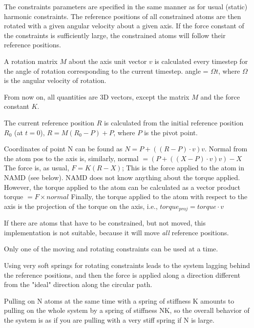 The constraints parameters are specified in the same manner as for
usual (static) harmonic constraints. The reference positions of all
constrained atoms are then rotated with a given angular velocity
about a given axis. If the force constant of the constraints is
sufficiently
large, the constrained atoms will follow their reference positions.

A rotation matrix $M$ about the axis unit vector $v$ is calculated every
timestep
for the angle of rotation corresponding to the current timestep.
    angle = $\Omega t$,
where $\Omega$ is the angular velocity of rotation.

From now on, all quantities are 3D vectors, except the matrix $M$ and the
force constant $K$.

The current reference position $R$ is calculated from the initial
reference
position $R_0$ (at $t=0$),
    $R = M (R_0 - P) + P$,
where $P$ is the pivot point.

%
%
%

Coordinates of point N can be found as
   $N = P + ( (R - P) \cdot v ) v$.
Normal from the atom pos to the axis is, similarly,
   normal $= ( P + ( (X - P) \cdot v ) v ) - X$
The force is, as usual,
   $F = K (R - X)$;
This is the force applied to the atom in NAMD (see below).
NAMD does not know anything about the torque
applied. However, the torque applied to the atom can be calculated
as a vector product
   torque $= F \times normal$
Finally, the torque applied to the atom with respect to the axis
is the projection of the torque on the axis, i.e.,
   $torque_{proj} = torque \cdot v$

If there are atoms that have to be constrained, but not moved,
this implementation is not suitable, because it will move {\em all}
reference positions.

Only one of the moving and rotating constraints can be used at a
time.

Using very soft springs for rotating constraints leads to the system
   lagging behind the reference positions, and then the force is applied
   along a direction different from the "ideal" direction along the
   circular path.

Pulling on N atoms at the same time with a spring of stiffness K
   amounts to pulling on the whole system by a spring of stiffness NK,
   so the overall behavior of the system is as if you are pulling with a
   very stiff spring if N is large.

